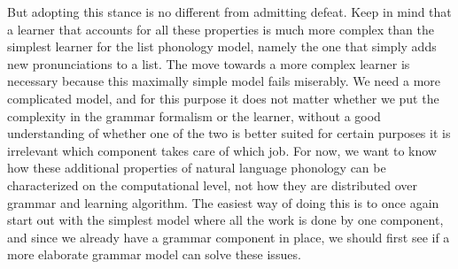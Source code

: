 But adopting this stance is no different from admitting defeat.
Keep in mind that a learner that accounts for all these properties is much more complex than the simplest learner for the list phonology model, namely the one that simply adds new pronunciations to a list.
The move towards a more complex learner is necessary because this maximally simple model fails miserably.
We need a more complicated model, and for this purpose it does not matter whether we put the complexity in the grammar formalism or the learner, without a good understanding of whether one of the two is better suited for certain purposes it is irrelevant which component takes care of which job.
For now, we want to know how these additional properties of natural language phonology can be characterized on the computational level, not how they are distributed over grammar and learning algorithm.
The easiest way of doing this is to once again start out with the simplest model where all the work is done by one component, and since we already have a grammar component in place, we should first see if a more elaborate grammar model can solve these issues. 


